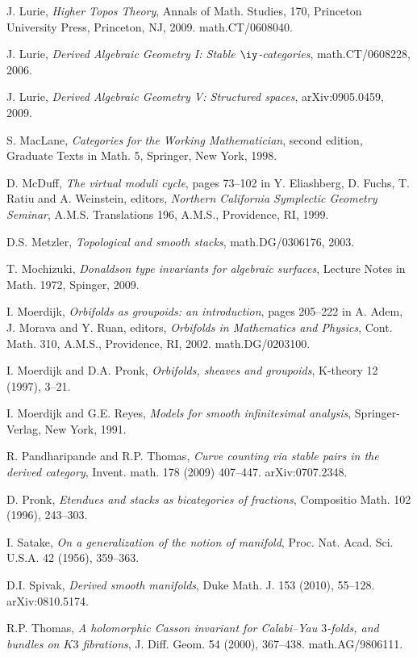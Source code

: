 \documentclass{article}
\begin{document}
\begin{thebibliography}{99}
 J. Lurie, {\it Higher Topos Theory}, Annals of
Math. Studies, 170, Princeton University Press, Princeton, NJ, 2009.
math.CT/0608040.

 J. Lurie, {\it Derived Algebraic Geometry I: Stable
$\iy$-categories}, \hfil\break math.CT/0608228, 2006.

 J. Lurie, {\it Derived Algebraic Geometry V:
Structured spaces}, \hfil\break arXiv:0905.0459, 2009.

 S. MacLane, {\it Categories for the Working
Mathematician}, second edition, Graduate Texts in Math. 5, Springer,
New York, 1998.

 D. McDuff, {\it The virtual moduli cycle}, pages
73--102 in Y. Eliashberg, D. Fuchs, T. Ratiu and A. Weinstein,
editors, {\it Northern California Symplectic Geometry Seminar},
A.M.S. Translations 196, A.M.S., Providence, RI, 1999.

 D.S. Metzler, {\it Topological and smooth stacks},
math.DG/0306176, 2003.

 T. Mochizuki, {\it Donaldson type invariants for
algebraic surfaces}, Lecture Notes in Math. 1972, Spinger, 2009.

 I. Moerdijk, {\it Orbifolds as groupoids: an
introduction}, pages 205--222 in A. Adem, J. Morava and Y. Ruan,
editors, {\it Orbifolds in Mathematics and Physics}, Cont. Math.
310, A.M.S., Providence, RI, 2002. math.DG/0203100.

 I. Moerdijk and D.A. Pronk, {\it Orbifolds, sheaves
and groupoids}, K-theory 12 (1997), 3--21.

 I. Moerdijk and G.E. Reyes, {\it Models for smooth
infinitesimal analysis}, Springer-Verlag, New York, 1991.

 R. Pandharipande and R.P. Thomas, {\it Curve
counting via stable pairs in the derived category}, Invent. math.
178 (2009) 407--447. arXiv:0707.2348.

 D. Pronk, {\it Etendues and stacks as bicategories of
fractions}, Compositio Math. 102 (1996), 243--303.

 I. Satake, {\it On a generalization of the notion of
manifold}, Proc. Nat. Acad. Sci. U.S.A. 42 (1956), 359--363.

 D.I. Spivak, {\it Derived smooth manifolds},
Duke Math. J. 153 (2010), 55--128. arXiv:0810.5174.

 R.P. Thomas, {\it A holomorphic Casson invariant for
Calabi--Yau $3$-folds, and bundles on $K3$ fibrations}, J. Diff.
Geom. 54 (2000), 367--438. \hfil\break math.AG/9806111.


\end{thebibliography}
\end{document}
